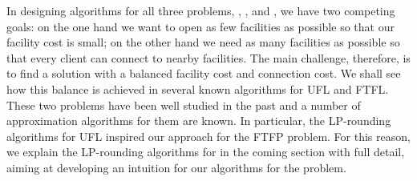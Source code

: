 \documentclass[oneside,final]{ucr}
\begin{document}
In designing algorithms for all three problems, {\UFL},
{\FTFL}, and {\FTFP}, we have two competing goals: on the
one hand we want to open as few facilities as possible so
that our facility cost is small; on the other hand we need
as many facilities as possible so that every client can
connect to nearby facilities. The main challenge, therefore,
is to find a solution with a balanced facility cost and
connection cost. We shall see how this balance is achieved
in several known algorithms for UFL and FTFL. These two
problems have been well studied in the past and a number of
approximation algorithms for them are known. In particular,
the LP-rounding algorithms for UFL inspired our approach for
the FTFP problem. For this reason, we explain the
LP-rounding algorithms for {\UFL} in the coming section with
full detail, aiming at developing an intuition for our
algorithms for the {\FTFP} problem.
\end{document}
